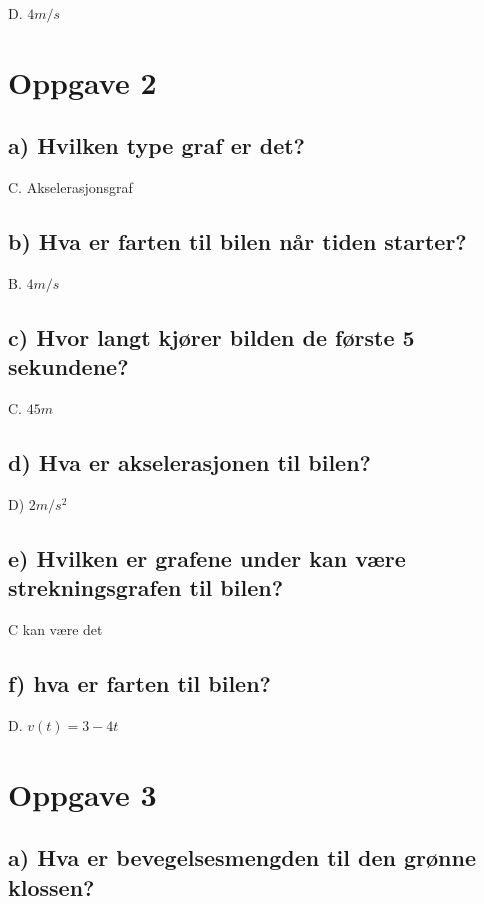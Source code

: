 \documentclass{article}
\begin{document}
D. $4 m/s$

\section{Oppgave 2}

\subsection{a) Hvilken type graf er det?}

C. Akselerasjonsgraf

\subsection{b) Hva er farten til bilen når tiden starter?}

B. $4 m/s$

\subsection{c) Hvor langt kjører bilden de første 5 sekundene?}

C. $45 m$

\subsection{d) Hva er akselerasjonen til bilen?}

D) $2 m/s^2$

\subsection{e) Hvilken er grafene under kan være strekningsgrafen til bilen?}

C kan være det

\subsection{f) hva er farten til bilen?}

D. $v(t) = 3 - 4t$

\section{Oppgave 3}

\subsection{a) Hva er bevegelsesmengden til den grønne klossen?}
\end{document}
